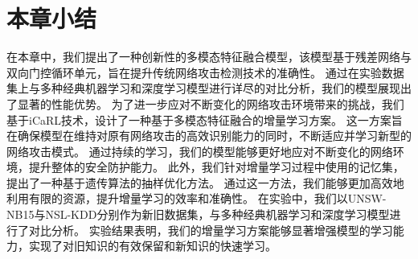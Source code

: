 \section{本章小结}
在本章中，我们提出了一种创新性的多模态特征融合模型，该模型基于残差网络与双向门控循环单元，旨在提升传统网络攻击检测技术的准确性。
通过在实验数据集上与多种经典机器学习和深度学习模型进行详尽的对比分析，我们的模型展现出了显著的性能优势。
为了进一步应对不断变化的网络攻击环境带来的挑战，我们基于iCaRL技术，设计了一种基于多模态特征融合的增量学习方案。
这一方案旨在确保模型在维持对原有网络攻击的高效识别能力的同时，不断适应并学习新型的网络攻击模式。
通过持续的学习，我们的模型能够更好地应对不断变化的网络环境，提升整体的安全防护能力。
此外，我们针对增量学习过程中使用的记忆集，提出了一种基于遗传算法的抽样优化方法。
通过这一方法，我们能够更加高效地利用有限的资源，提升增量学习的效率和准确性。
在实验中，我们以UNSW-NB15与NSL-KDD分别作为新旧数据集，与多种经典机器学习和深度学习模型进行了对比分析。
实验结果表明，我们的增量学习方案能够显著增强模型的学习能力，实现了对旧知识的有效保留和新知识的快速学习。

